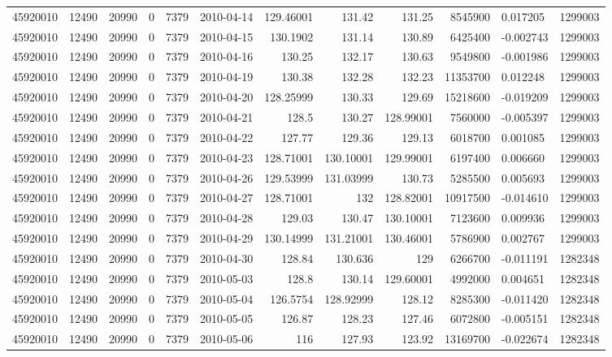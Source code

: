 \begin{tabular}{l | r | r | r | r | l | r | r | r | r | l | r}
45920010 & 12490 & 20990 & 0 & 7379 & 2010-04-14 & 129.46001 & 131.42 & 131.25 & 8545900 & 0.017205 & 1299003 \\
45920010 & 12490 & 20990 & 0 & 7379 & 2010-04-15 & 130.1902 & 131.14 & 130.89 & 6425400 & -0.002743 & 1299003 \\
45920010 & 12490 & 20990 & 0 & 7379 & 2010-04-16 & 130.25 & 132.17 & 130.63 & 9549800 & -0.001986 & 1299003 \\
45920010 & 12490 & 20990 & 0 & 7379 & 2010-04-19 & 130.38 & 132.28 & 132.23 & 11353700 & 0.012248 & 1299003 \\
45920010 & 12490 & 20990 & 0 & 7379 & 2010-04-20 & 128.25999 & 130.33 & 129.69 & 15218600 & -0.019209 & 1299003 \\
45920010 & 12490 & 20990 & 0 & 7379 & 2010-04-21 & 128.5 & 130.27 & 128.99001 & 7560000 & -0.005397 & 1299003 \\
45920010 & 12490 & 20990 & 0 & 7379 & 2010-04-22 & 127.77 & 129.36 & 129.13 & 6018700 & 0.001085 & 1299003 \\
45920010 & 12490 & 20990 & 0 & 7379 & 2010-04-23 & 128.71001 & 130.10001 & 129.99001 & 6197400 & 0.006660 & 1299003 \\
45920010 & 12490 & 20990 & 0 & 7379 & 2010-04-26 & 129.53999 & 131.03999 & 130.73 & 5285500 & 0.005693 & 1299003 \\
45920010 & 12490 & 20990 & 0 & 7379 & 2010-04-27 & 128.71001 & 132 & 128.82001 & 10917500 & -0.014610 & 1299003 \\
45920010 & 12490 & 20990 & 0 & 7379 & 2010-04-28 & 129.03 & 130.47 & 130.10001 & 7123600 & 0.009936 & 1299003 \\
45920010 & 12490 & 20990 & 0 & 7379 & 2010-04-29 & 130.14999 & 131.21001 & 130.46001 & 5786900 & 0.002767 & 1299003 \\
45920010 & 12490 & 20990 & 0 & 7379 & 2010-04-30 & 128.84 & 130.636 & 129 & 6266700 & -0.011191 & 1282348 \\
45920010 & 12490 & 20990 & 0 & 7379 & 2010-05-03 & 128.8 & 130.14 & 129.60001 & 4992000 & 0.004651 & 1282348 \\
45920010 & 12490 & 20990 & 0 & 7379 & 2010-05-04 & 126.5754 & 128.92999 & 128.12 & 8285300 & -0.011420 & 1282348 \\
45920010 & 12490 & 20990 & 0 & 7379 & 2010-05-05 & 126.87 & 128.23 & 127.46 & 6072800 & -0.005151 & 1282348 \\
45920010 & 12490 & 20990 & 0 & 7379 & 2010-05-06 & 116 & 127.93 & 123.92 & 13169700 & -0.022674 & 1282348 \\

\end{tabular}

